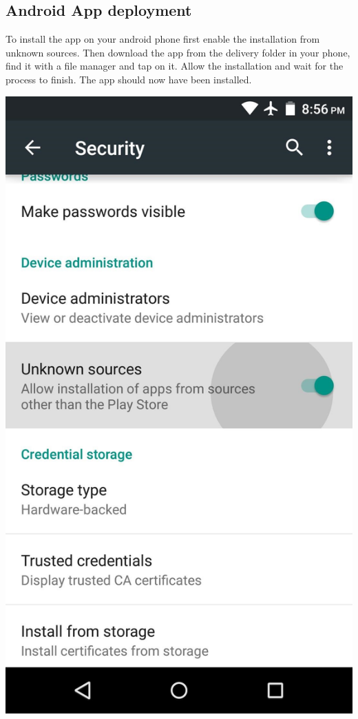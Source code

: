 \subsection{Android App deployment}

To install the app on your android phone first enable the installation from unknown sources. Then download the app from the delivery folder in your phone, find it with a file manager and tap on it. Allow the installation and wait for the process to finish. The app should now have been installed.

\begin{center}
   \includegraphics[scale=0.15]{resources/unknowsources.jpg}
\end{center}


